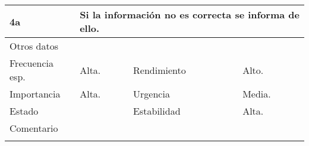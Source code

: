 \documentclass{article}
\begin{document}
\begin{table}[h]
\begin{tabular}{|l|l|l|l|l|l|}
\hline
\multicolumn{1}{|p{1cm}}{4a} & \multicolumn{5}{|p{9cm}|}{Si la información no es correcta se informa de ello.}\\
\hline
\multicolumn{6}{|p{10cm}|}{Otros datos}\\
\hline
\multicolumn{1}{|p{2cm}|}{Frecuencia esp.} & \multicolumn{2}{p{3cm}}{Alta.} & \multicolumn{1}{|p{2cm}|}{Rendimiento} & \multicolumn{2}{p{3cm}|}{Alto.}\\
\hline
\multicolumn{1}{|p{2cm}|}{Importancia} & \multicolumn{2}{p{3cm}}{Alta.} & \multicolumn{1}{|p{2cm}|}{Urgencia} & \multicolumn{2}{p{3cm}|}{Media.}\\
\hline
\multicolumn{1}{|p{2cm}|}{Estado} & \multicolumn{2}{p{3cm}}{} & \multicolumn{1}{|p{2cm}|}{Estabilidad} & \multicolumn{2}{p{3cm}|}{Alta.}\\
\hline
\multicolumn{6}{|p{10cm}|}{Comentario}\\
\hline
\multicolumn{6}{|p{10cm}|}{}\\
\hline
\end{tabular}
\end{table}
\addtocounter{ni}{1}
\end{document}
